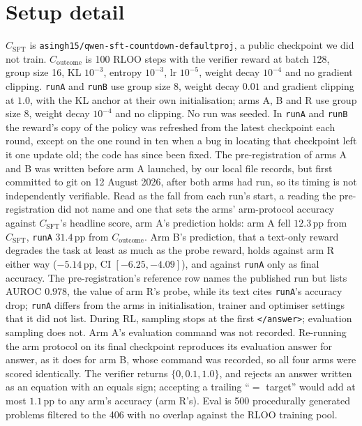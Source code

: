 \documentclass{article}
\begin{document}
\section{Setup detail}\label{app:setup}

$C_{\text{SFT}}$ is \texttt{asingh15/qwen-sft-countdown-defaultproj}, a public checkpoint we did not train. $C_{\text{outcome}}$ is 100 RLOO \citep{ahmadian2024back} steps with the verifier reward at batch 128, group size 16, KL $10^{-3}$, entropy $10^{-3}$, lr $10^{-5}$, weight decay $10^{-4}$ and no gradient clipping. \texttt{runA} and \texttt{runB} use group size 8, weight decay $0.01$ and gradient clipping at $1.0$, with the KL anchor at their own initialisation; arms A, B and R use group size 8, weight decay $10^{-4}$ and no clipping. No run was seeded. In \texttt{runA} and \texttt{runB} the reward's copy of the policy was refreshed from the latest checkpoint each round, except on the one round in ten when a bug in locating that checkpoint left it one update old; the code has since been fixed. The pre-registration of arms A and B was written before arm A launched, by our local file records, but first committed to git on 12 August 2026, after both arms had run, so its timing is not independently verifiable. Read as the fall from each run's start, a reading the pre-registration did not name and one that sets the arms' arm-protocol accuracy against $C_{\text{SFT}}$'s headline score, arm A's prediction holds: arm A fell $12.3$\,pp from $C_{\text{SFT}}$, \texttt{runA} $31.4$\,pp from $C_{\text{outcome}}$. Arm B's prediction, that a text-only reward degrades the task at least as much as the probe reward, holds against arm R either way ($-5.14$\,pp, CI $[-6.25, -4.09]$), and against \texttt{runA} only as final accuracy. The pre-registration's reference row names the published run but lists AUROC $0.978$, the value of arm R's probe, while its text cites \texttt{runA}'s accuracy drop; \texttt{runA} differs from the arms in initialisation, trainer and optimiser settings that it did not list. During RL, sampling stops at the first \texttt{</answer>}; evaluation sampling does not. Arm A's evaluation command was not recorded. Re-running the arm protocol on its final checkpoint reproduces its evaluation answer for answer, as it does for arm B, whose command was recorded, so all four arms were scored identically. The verifier returns $\{0, 0.1, 1.0\}$, and rejects an answer written as an equation with an equals sign; accepting a trailing ``$=$ target'' would add at most $1.1$\,pp to any arm's accuracy (arm R's). Eval is 500 procedurally generated problems filtered to the 406 with no overlap against the RLOO training pool.
\end{document}
